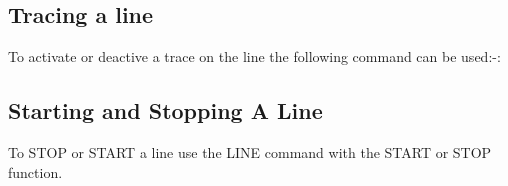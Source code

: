 \documentclass[letterpaper,10pt,english]{sphinxmanual}
\begin{document}
\begin{sphinxVerbatim}[commandchars=\\\{\}]
    
         
    
   
   
   
   
   
   
\end{sphinxVerbatim}

\newpage


\subsection{Tracing a line}
\label{\detokenize{audit_operations_ and_performance:index-6}}\label{\detokenize{audit_operations_ and_performance:tracing-a-line}}
To activate or deactive a trace on the line the following command can be used:-:

\begin{sphinxVerbatim}[commandchars=\\\{\}]
    \PYG{p}{[}     \PYG{p}{]}
\end{sphinxVerbatim}


\subsection{Starting and Stopping A Line}
\label{\detokenize{audit_operations_ and_performance:starting-and-stopping-a-line}}\label{\detokenize{audit_operations_ and_performance:index-7}}
To STOP or START a line use the LINE command with the START or STOP function.
\end{document}
